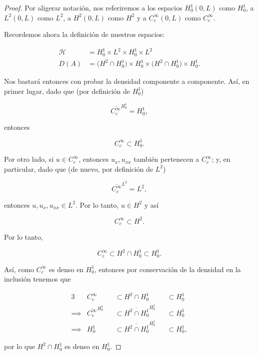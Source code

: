 \begin{proof}

    Por aligerar notación, nos referiremos a los espacios $H_0^1(0,L)$ como $H_0^1$, a $L^2(0,L)$ como $L^2$, a $H^2(0,L)$ como $H^2$ y a $C_c^{\infty}(0,L)$ como $C_c^{\infty}$.

    Recordemos ahora la definición de nuestros espacios:

    \begin{align}
        \mathcal{H} &= H_0^1 \times L^2 \times H_0^1 \times L^2\\
        D(A) &= \big(H^2 \cap H_0^1\big) \times H_0^1 \times \big(H^2 \cap H_0^1\big) \times H_0^1.
    \end{align}
    
    Nos bastará entonces con probar la densidad componente a componente. Así, en primer lugar, dado que (por definición de $H_0^1$)

    \[\overline{C_c^{\infty}}^{H_0^1} = H_0^1,\]

    entonces

    \[C_c^{\infty} \subset H_0^1.\]

    Por otro lado, si $u \in C_c^{\infty}$, entonces $u_x, u_{xx}$ también pertenecen a $C_c^{\infty}$; y, en particular, dado que (de nuevo, por definición de $L^2$)

    \[\overline{C_c^{\infty}}^{L^2} = L^2,\]

    entonces $u, u_x, u_{xx} \in L^2$. Por lo tanto, $u \in H^2$ y así

    \[C_c^{\infty} \subset H^2.\]

    Por lo tanto,

    \[C_c^{\infty} \subset H^2 \cap H_0^1 \subset H_0^1.\]

    Así, como $C_c^\infty$ es denso en $H_0^1$, entonces por conservación de la densidad en la inclusión tenemos que

    \begin{alignat*}{3}
        &C_c^{\infty} 
        &&\subset{} H^2 \cap H_0^1 
        &&\subset{} H_0^1\\
        \implies{}& \overline{C_c^{\infty}}^{H^1_0} 
        &&\subset{} \overline{H^2 \cap H_0^1}^{H^1_0} 
        &&\subset{} H_0^1\\
        \implies{}& H^1_0 
        &&\subset{} \overline{H^2 \cap H_0^1}^{H^1_0} 
        &&\subset{} H_0^1,
    \end{alignat*}

    por lo que $H^2 \cap H_0^1$ es denso en $H_0^1$.


\end{proof}
